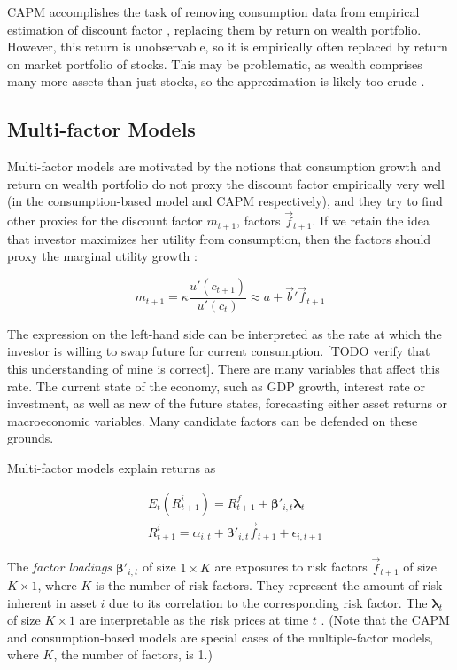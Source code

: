 	 		CAPM accomplishes the task of removing consumption data from empirical estimation of discount factor \citep{cochrane2009asset}, replacing them by return on wealth portfolio. However, this return is unobservable, so it is empirically often replaced by return on market portfolio of stocks. This may be problematic, as wealth comprises many more assets than just stocks, so the approximation is likely too crude \citep{roll1977critique}.  
	 		
	 		
	 	\subsection{Multi-factor Models}
	 		
	 		Multi-factor models are motivated by the notions that consumption growth and return on wealth portfolio do not proxy the discount factor empirically very well (in the consumption-based model and CAPM respectively), and they try to find other proxies for the discount factor $m_{t+1}$, factors $\vec{f}_{t+1}$. If we retain the idea that investor maximizes her utility from consumption, then the factors  should proxy the marginal utility growth \citep{cochrane2009asset}: 
	 		
	 		\begin{equation}
	 		m_{t+1} = \kappa \frac{u'(c_{t+1})}{u'(c_t)} \approx a+\vec{b}'\vec{f}_{t+1}
	 		\end{equation}
	 		
	 		The expression on the left-hand side can be interpreted as the rate at which the investor is willing to swap future for current consumption. [TODO verify that this understanding of mine is correct]. There are many variables that affect this rate. The current state of the economy, such as GDP growth, interest rate or investment, as well as new of the future states, forecasting either asset returns or macroeconomic variables. Many candidate factors can be defended on these grounds.   
	 		
	 		Multi-factor models explain returns as	 
	 	
	 	
			 	\begin{align}
			 		& E_t(R^i_{t+1}) = R^f_{t+1} + \boldsymbol\beta'_{i,t} \boldsymbol\lambda_{t} \\
			 		& R^i_{t+1} = \alpha_{i,t} + \boldsymbol\beta'_{i,t} \vec{f}_{t+1} + \epsilon_{i,t+1}
			 	\end{align}
			 
			 The \textit{factor loadings} $\boldsymbol\beta'_{i,t}$ of size $1\times K$ are exposures to risk factors $\vec{f}_{t+1}$ of size $K \times 1$, where $K$ is the number of risk factors. They represent the amount of risk inherent in asset $i$ due to its correlation to the corresponding risk factor. The $\boldsymbol\lambda_{t}$ of size $K \times 1$ are interpretable as the risk prices at time $t$ \citep{kelly2019characteristics}. (Note that the CAPM and consumption-based models are special cases of the multiple-factor models, where $K$, the number of factors, is 1.) 			
			 
